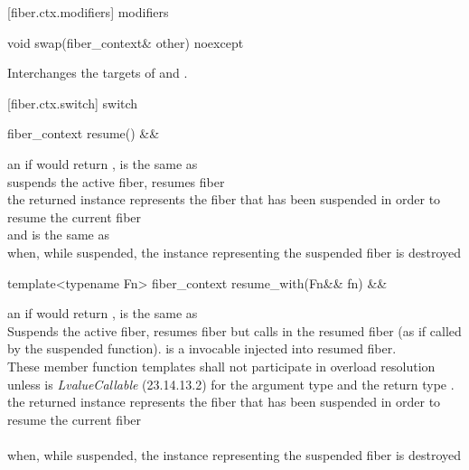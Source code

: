[fiber.ctx.modifiers]{ modifiers}

\begin{itemdecl}
    void swap(fiber_context& other) noexcept
\end{itemdecl}

\begin{itemdescr}
\pnum
\effects Interchanges the targets of  and .
\end{itemdescr}



[fiber.ctx.switch]{ switch}

%
\begin{itemdecl}
fiber_context resume() &&
\end{itemdecl}

\begin{itemdescr}
\pnum
\preconditions {} an if \canxtresume would return ,
\currthread is the same as \lastthread\\
\effects suspends the active fiber, resumes fiber \\
\returns the returned instance represents the fiber that has been suspended in
order to resume the current fiber\\
\postcondition {} and \currthread is the same as \lastthread\\
\throws \unwindex when, while suspended, the \fiber instance representing the
suspended fiber is destroyed
\end{itemdescr}

%
\begin{itemdecl}
template<typename Fn>
fiber_context resume_with(Fn&& fn) &&
\end{itemdecl}

\begin{itemdescr}
\pnum
\preconditions {} an if \canxtresume would return ,
\currthread is the same as \lastthread\\
\effects Suspends the active fiber, resumes fiber  but calls
 in the resumed fiber (as if called by the suspended function).
 is a invocable injected into resumed fiber.\\
These member function templates shall not participate in overload resolution
unless  is \emph{LvalueCallable} (23.14.13.2) for the argument type
 and the return type \fiber.\\
\returns the returned instance represents the fiber that has been suspended in
order to resume the current fiber\\
\postcondition {}\\
\throws \unwindex when, while suspended, the \fiber instance representing the
suspended fiber is destroyed
\end{itemdescr}

